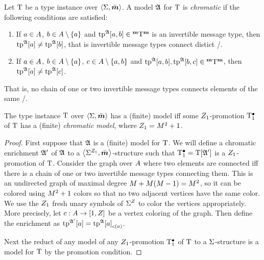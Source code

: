 \begin{definition}
Let $\mathrm{T}$ be a type instance over $\left\langle \mathrm{\Sigma},\bar{\bm{m}} \right\rangle$.
A model $\mathfrak{A}$ for $\mathrm{T}$ is \emph{chromatic}
if the following conditions are satisfied:
\begin{enumerate}
  \item If $a\in A$, $b\in A\setminus\left\{a\right\}$ and
  $\operatorname{tp}^{\mathfrak{A}}[a,b]\in{{}^{\bm{\mathrm{m}}}{\mathrm{T}}^{\bm{\mathrm{m}}}}$ is an invertible message type,
  then $\operatorname{tp}^{\mathfrak{A}}[a]\neq\operatorname{tp}^{\mathfrak{A}}[b]$, that is invertible message types
  connect distict \onetypes/.
  \item If $a\in A$, $b\in A\setminus\left\{a\right\}$,
  $c\in A\setminus\left\{a,b\right\}$ and $\operatorname{tp}^{\mathfrak{A}}[a,b], 
  \operatorname{tp}^{\mathfrak{A}}[b,c]\in{{}^{\bm{\mathrm{m}}}{\mathrm{T}}^{\bm{\mathrm{m}}}}$, then $\operatorname{tp}^{\mathfrak{A}}[a]\neq\operatorname{tp}^{\mathfrak{A}}[c]$.
\end{enumerate}
That is, no chain of one or two invertible message types connects elements of
the same \onetype/.
\end{definition}
\begin{remark}\label{rem:prop-chroma}
The type instance $\mathrm{T}$ over $\left\langle \mathrm{\Sigma},\bar{\bm{m}} \right\rangle$ has a (finite) model
iff some $Z_{1}$-promotion $\mathrm{T}_{1}^{\bullet}$ of $\mathrm{T}$ has a (finite)
\emph{chromatic model}, where $Z_{1} = M^2+1$.
\end{remark}
\begin{proof}
First suppose that $\mathfrak{A}$ is a (finite) model for $\mathrm{T}$.
We will define a chromatic enrichment $\mathfrak{A'}$ of $\mathfrak{A}$ to a
$\left\langle {\mathrm{\Sigma}}^{Z_{1}},\bar{\bm{m}} \right\rangle$-structure such that $\mathrm{T}_{1}^{\bullet} = \mathrm{T}[\mathfrak{A'}]$ is a
$Z_{1}$-promotion of $\mathrm{T}$.
Consider the graph over $A$ where two elements are connected iff there is a
chain of one or two invertible message types connecting them.
This is an undirected graph of maximal degree $M+M(M-1)=M^2$, so it can
be colored using $M^2+1$ colors so that no two adjacent vertices have the same
color. We use the $Z_{1}$ fresh unary symbols of ${\mathrm{\Sigma}}^{Z}$ to color the
vertices appropriately. More precisely, let $c : A\to[1,Z]$ be a vertex
coloring of the graph. Then define the enrichment as
$\operatorname{tp}^{\mathfrak{A'}}[a] = {\operatorname{tp}^{\mathfrak{A}}[a]}_{c(a)}$.

Next the reduct of any model of any $Z_{1}$-promotion $\mathrm{T}_{1}^{\bullet}$ of $\mathrm{T}$ to a
$\mathrm{\Sigma}$-structure is a model for $\mathrm{T}$ by the promotion condition.
\end{proof}

